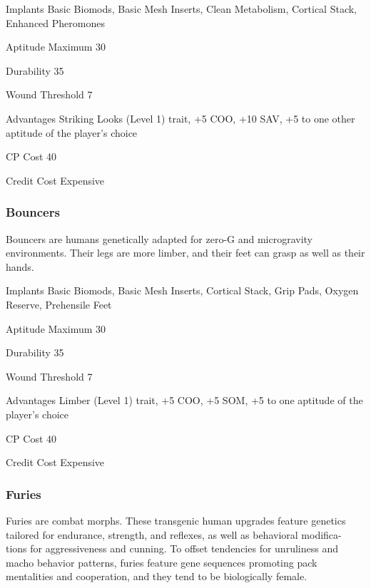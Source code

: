 \begin{description*} \item[Implants] Basic Biomods, Basic Mesh Inserts, Clean Metabolism, Cortical Stack, Enhanced Pheromones \item[Aptitude Maximum] 30 \item[Durability] 35 \item[Wound Threshold] 7 \item[Advantages] Striking Looks (Level 1) trait, +5 COO, +10 SAV, +5 to one other aptitude of the player’s choice \item[CP Cost] 40 \item[Credit Cost] Expensive \end{description*} 

\subsubsection{Bouncers} \label{sec:starting-bouncers} 

Bouncers are humans genetically adapted for zero-G and microgravity environments. Their legs are more limber, and their feet can grasp as well as their hands. 

\begin{description*} \item[Implants] Basic Biomods, Basic Mesh Inserts, Cortical Stack, Grip Pads, Oxygen Reserve, Prehensile Feet \item[Aptitude Maximum] 30 \item[Durability] 35 \item[Wound Threshold] 7 \item[Advantages] Limber (Level 1) trait, +5 COO, +5 SOM, +5 to one aptitude of the player’s choice \item[CP Cost] 40 \item[Credit Cost] Expensive \end{description*} 

\subsubsection{Furies} \label{sec:starting-furies} 

Furies are combat morphs. These transgenic human upgrades feature genetics tailored for endurance, strength, and reflexes, as well as behavioral modifica- tions for aggressiveness and cunning. To offset tendencies for unruliness and macho behavior patterns, furies feature gene sequences promoting pack mentalities and cooperation, and they tend to be biologically female. 

